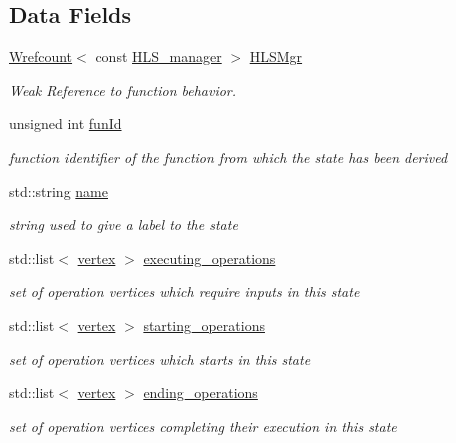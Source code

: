\subsection*{Data Fields}
\begin{DoxyCompactItemize}
\item 
\hyperlink{classWrefcount}{Wrefcount}$<$ const \hyperlink{classHLS__manager}{H\+L\+S\+\_\+manager} $>$ \hyperlink{structStateInfo_ad9d6e719a4e7174e79525787007ff965}{H\+L\+S\+Mgr}
\begin{DoxyCompactList}\small\item\em Weak Reference to function behavior. \end{DoxyCompactList}\item 
unsigned int \hyperlink{structStateInfo_af1ebd3667e849e900bdafec726887adc}{fun\+Id}
\begin{DoxyCompactList}\small\item\em function identifier of the function from which the state has been derived \end{DoxyCompactList}\item 
std\+::string \hyperlink{structStateInfo_acb903ffca2d2e1e690a5de8075c115b7}{name}
\begin{DoxyCompactList}\small\item\em string used to give a label to the state \end{DoxyCompactList}\item 
std\+::list$<$ \hyperlink{graph_8hpp_abefdcf0544e601805af44eca032cca14}{vertex} $>$ \hyperlink{structStateInfo_adfebba4a9da0a2f3c77f198a53055076}{executing\+\_\+operations}
\begin{DoxyCompactList}\small\item\em set of operation vertices which require inputs in this state \end{DoxyCompactList}\item 
std\+::list$<$ \hyperlink{graph_8hpp_abefdcf0544e601805af44eca032cca14}{vertex} $>$ \hyperlink{structStateInfo_a6bdb118c9adb909da0722d4bc720c2e4}{starting\+\_\+operations}
\begin{DoxyCompactList}\small\item\em set of operation vertices which starts in this state \end{DoxyCompactList}\item 
std\+::list$<$ \hyperlink{graph_8hpp_abefdcf0544e601805af44eca032cca14}{vertex} $>$ \hyperlink{structStateInfo_a85b521a26e34394aabb7c38f742a95cf}{ending\+\_\+operations}
\begin{DoxyCompactList}\small\item\em set of operation vertices completing their execution in this state \end{DoxyCompactList}\item 

\end{DoxyCompactItemize}
